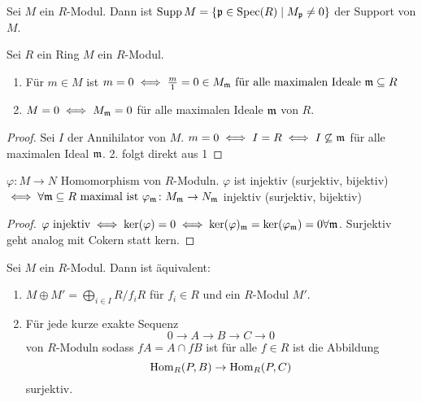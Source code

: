 \begin{Def}
    Sei $M$ ein $R$-Modul. Dann ist $\operatorname{Supp} M=\{\mathfrak{p}\in\operatorname{Spec}(R)\mid M_{\mathfrak{p}}\neq 0\}$ der Support von $M$.
\end{Def}
\begin{Lemma}
    Sei $R$ ein Ring $M$ ein $R$-Modul.
    \begin{enumerate}
        \item Für $m\in M$ ist $m=0\iff \frac m 1=0\in M_{\mathfrak{m}} \text{ für alle maximalen Ideale $\mathfrak{m}\subseteq R$}$
        \item $M=0\iff M_{\mathfrak{m}}=0$ für alle maximalen Ideale $\mathfrak{m}$ von $R$.
    \end{enumerate}
\end{Lemma}
\begin{proof}
    Sei $I$ der Annihilator von $M$.
    $m=0\iff I=R\iff I\not\subseteq \mathfrak{m}$ für alle maximalen Ideal $\mathfrak{m}$.
    2. folgt direkt aus 1
\end{proof}
\begin{Kor}
    $\varphi\colon M\to N$ Homomorphism von $R$-Moduln.
    $\varphi$ ist injektiv (surjektiv, bijektiv) $\iff \forall \mathfrak{m}\subseteq R \text{ maximal ist } \varphi_{\mathfrak{m}}\colon M_{\mathfrak{m}}\to N_{\mathfrak{m}}$ injektiv (surjektiv, bijektiv) 
\end{Kor}
\begin{proof}
    $\varphi \text{ injektiv} \iff \ker(\varphi)=0\iff \ker(\varphi)_{\mathfrak{m}}=\ker(\varphi_{\mathfrak{m}})=0 \forall \mathfrak{m}$. Surjektiv geht analog mit Cokern statt kern.
\end{proof}
\begin{Lemma}\label{Lem:SpaltenModDirSum}
    Sei $M$ ein $R$-Modul. Dann ist äquivalent:
    \begin{enumerate}
        \item $M\oplus M'=\bigoplus_{i\in I}R/f_iR$ für $f_i\in R$ und ein $R$-Modul $M'$.
        \item Für jede kurze exakte Sequenz $$0\to A\to B\to C\to 0$$ von $R$-Moduln sodass $fA=A\cap fB$ ist für alle $f\in R$ ist die Abbildung $$\operatorname{Hom}_R(P,B)\to\operatorname{Hom}_R(P,C)$$ surjektiv.
    \end{enumerate}
\end{Lemma}

